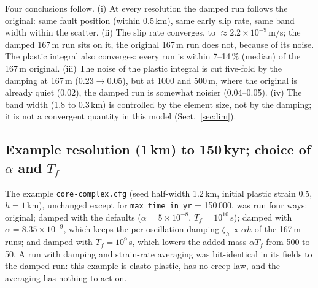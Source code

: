 \documentclass[11pt]{article}
\newcommand{\code}[1]{\texttt{#1}}
\begin{document}
Four conclusions follow. (i) At every resolution the damped run follows the original: same fault
position (within 0.5\,km), same early slip rate, same band width within the scatter. (ii) The slip
rate converges, to $\approx2.2\times10^{-9}$\,m/s; the damped 167\,m run sits on it, the original
167\,m run does not, because of its noise. The plastic integral also converges: every run is within
7--14\,\% (median) of the 167\,m original. (iii) The noise of the plastic integral is cut five-fold
by the damping at 167\,m (0.23$\to$0.05), but at 1000 and 500\,m, where the original is already quiet
(0.02), the damped run is somewhat noisier (0.04--0.05). (iv) The band width (1.8 to 0.3\,km) is
controlled by the element size, not by the damping; it is not a convergent quantity in this model
(Sect.~\ref{sec:lim}).

\subsection{Example resolution (1\,km) to 150\,kyr; choice of $\alpha$ and $T_f$}
The example \code{core-complex.cfg} (seed half-width 1.2\,km, initial plastic strain 0.5,
$h=1$\,km), unchanged except for \code{max\_time\_in\_yr} = 150\,000, was run four ways: original;
damped with the defaults ($\alpha=5\times10^{-8}$, $T_f=10^{10}$\,s); damped with
$\alpha=8.35\times10^{-9}$, which keeps the per-oscillation damping $\zeta_h\propto\alpha h$ of
the 167\,m runs; and damped with $T_f=10^9$\,s, which lowers the added mass $\alpha T_f$ from 500 to
50. A run with damping and strain-rate averaging was bit-identical in its fields to the damped run:
this example is elasto-plastic, has no creep law, and the averaging has nothing to act on.
\end{document}
